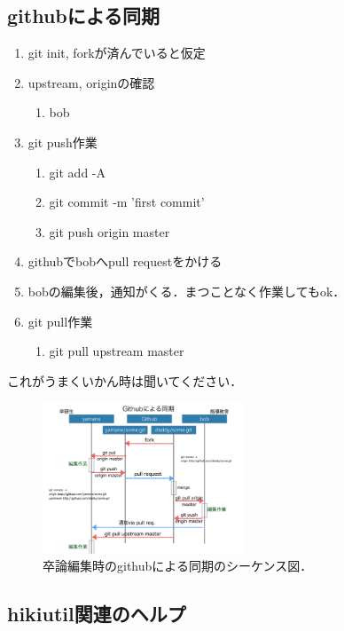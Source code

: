 \subsection{githubによる同期}
\begin{enumerate}
\item git init, forkが済んでいると仮定
\item upstream, originの確認
\begin{enumerate}
\item bob%
\end{enumerate}
\item git push作業
\begin{enumerate}
\item git add -A
\item git commit -m 'first commit'
\item git push origin master
\end{enumerate}
\item githubでbobへpull requestをかける
\item bobの編集後，通知がくる．まつことなく作業してもok．
\item git pull作業
\begin{enumerate}
\item git pull upstream master
\end{enumerate}
\end{enumerate}
これがうまくいかん時は聞いてください．

\begin{figure}[htbp]\begin{center}
\includegraphics[width=6cm,bb=0 0 442 432]{../figs/./hikiutils_bob.004.jpeg}
\caption{卒論編集時のgithubによる同期のシーケンス図．}
\label{default}\end{center}\end{figure}
\subsection{hikiutil関連のヘルプ}
